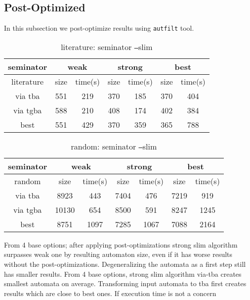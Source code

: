 \documentclass[
	digital
nolof, nolot
]{fithesis3}
\begin{document}
	\subsection{Post-Optimized}
	In this subsection we post-optimize results using \texttt{autfilt} tool.
	
	\begin{table}[ht]
		\centering
		\caption{literature: seminator \texttt{--}slim}
		\begin{tabular}{ |c||c|c|c|c|c|c| } 
			\hline
			seminator&\multicolumn{2}{c|}{weak}&\multicolumn{2}{c|}{strong}&\multicolumn{2}{c|}{best} \\
			\hline
			literature&size&time(s)&size&time(s)&size&time(s)\\
			\hhline{|=======|}
			
			via tba&551&219& 370 &185& 370&404\\
			\hline
			via tgba&588&210& 408&174& 402&384\\ 
			\hline
			best&551&429& 370&359& 365&788 \\ 
			\hline
		\end{tabular}
	\end{table}
	
	\begin{table}[ht]
		\centering
		\caption{random: seminator \texttt{--}slim}
		\begin{tabular}{ |c|c|c|c|c|c|c| } 
			\hline
			seminator&\multicolumn{2}{c|}{weak}&\multicolumn{2}{c|}{strong}&\multicolumn{2}{c|}{best} \\
			\hline
			random&size&time(s)&size&time(s)&size&time(s)\\
			\hline
			via tba&8923&443& 7404 &476& 7219&919\\
			\hline
			via tgba&10130&654& 8500&591& 8247&1245\\ 
			\hline
			best&8751&1097& 7285&1067& 7088&2164 \\ 
			\hline
		\end{tabular}
	\end{table}
	
	From 4 base options; after applying post-optimizations strong slim algorithm surpasses weak one by resulting automaton size, even if it has worse results without the post-optimizations.
	Degeneralizing the automata as a first step still has smaller results.
	From 4 base options, strong slim algorithm via-tba creates smallest automata on average.
	Transforming input automata to tba first creates results which are close to best ones. If execution time is not a concern
	
\end{document}
